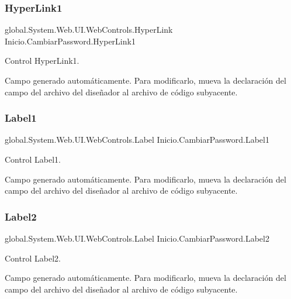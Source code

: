 \subsubsection{\texorpdfstring{HyperLink1}{HyperLink1}}
{\footnotesize\ttfamily global.\+System.\+Web.\+U\+I.\+Web\+Controls.\+Hyper\+Link Inicio.\+Cambiar\+Password.\+Hyper\+Link1\hspace{0.3cm}{\ttfamily [protected]}}



Control Hyper\+Link1. 

Campo generado automáticamente. Para modificarlo, mueva la declaración del campo del archivo del diseñador al archivo de código subyacente. \mbox{\label{classInicio_1_1CambiarPassword_ac4c5034d33d8290117987f9fc981e247}} 
\subsubsection{\texorpdfstring{Label1}{Label1}}
{\footnotesize\ttfamily global.\+System.\+Web.\+U\+I.\+Web\+Controls.\+Label Inicio.\+Cambiar\+Password.\+Label1\hspace{0.3cm}{\ttfamily [protected]}}



Control Label1. 

Campo generado automáticamente. Para modificarlo, mueva la declaración del campo del archivo del diseñador al archivo de código subyacente. \mbox{\label{classInicio_1_1CambiarPassword_ab4a6fd8e13543ff98bc786be8a2b3a1c}} 
\subsubsection{\texorpdfstring{Label2}{Label2}}
{\footnotesize\ttfamily global.\+System.\+Web.\+U\+I.\+Web\+Controls.\+Label Inicio.\+Cambiar\+Password.\+Label2\hspace{0.3cm}{\ttfamily [protected]}}



Control Label2. 

Campo generado automáticamente. Para modificarlo, mueva la declaración del campo del archivo del diseñador al archivo de código subyacente. \mbox{\label{classInicio_1_1CambiarPassword_a4aa07cf906d98059cf6158cf3e31800a}} 
